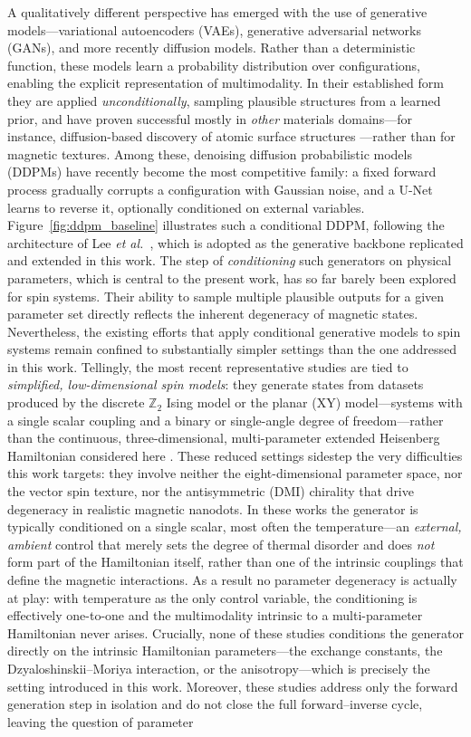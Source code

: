 \documentclass[letterpaper, 12, one column]{article}
\begin{document}
A qualitatively different perspective has emerged with the use of generative models---variational autoencoders (VAEs), generative adversarial networks (GANs), and more recently diffusion models. Rather than a deterministic function, these models learn a probability distribution over configurations, enabling the explicit representation of multimodality. In their established form they are applied \emph{unconditionally}, sampling plausible structures from a learned prior, and have proven successful mostly in \emph{other} materials domains---for instance, diffusion-based discovery of atomic surface structures \cite{Ronne2024}---rather than for magnetic textures. Among these, denoising diffusion probabilistic models (DDPMs) have recently become the most competitive family: a fixed forward process gradually corrupts a configuration with Gaussian noise, and a U-Net learns to reverse it, optionally conditioned on external variables. Figure~\ref{fig:ddpm_baseline} illustrates such a conditional DDPM, following the architecture of Lee \emph{et al.}~\cite{lee2025thermodynamic}, which is adopted as the generative backbone replicated and extended in this work. The step of \emph{conditioning} such generators on physical parameters, which is central to the present work, has so far barely been explored for spin systems. Their ability to sample multiple plausible outputs for a given parameter set directly reflects the inherent degeneracy of magnetic states. Nevertheless, the existing efforts that apply conditional generative models to spin systems remain confined to substantially simpler settings than the one addressed in this work. Tellingly, the most recent representative studies are tied to \emph{simplified, low-dimensional spin models}: they generate states from datasets produced by the discrete $\mathbb{Z}_2$ Ising model or the planar (XY) model---systems with a single scalar coupling and a binary or single-angle degree of freedom---rather than the continuous, three-dimensional, multi-parameter extended Heisenberg Hamiltonian considered here \cite{lee2025thermodynamic, jha2026topological}. These reduced settings sidestep the very difficulties this work targets: they involve neither the eight-dimensional parameter space, nor the vector spin texture, nor the antisymmetric (DMI) chirality that drive degeneracy in realistic magnetic nanodots. In these works the generator is typically conditioned on a single scalar, most often the temperature---an \emph{external, ambient} control that merely sets the degree of thermal disorder and does \emph{not} form part of the Hamiltonian itself, rather than one of the intrinsic couplings that define the magnetic interactions. As a result no parameter degeneracy is actually at play: with temperature as the only control variable, the conditioning is effectively one-to-one and the multimodality intrinsic to a multi-parameter Hamiltonian never arises. Crucially, none of these studies conditions the generator directly on the intrinsic Hamiltonian parameters---the exchange constants, the Dzyaloshinskii--Moriya interaction, or the anisotropy---which is precisely the setting introduced in this work. Moreover, these studies address only the forward generation step in isolation and do not close the full forward--inverse cycle, leaving the question of parameter 
\end{document}
